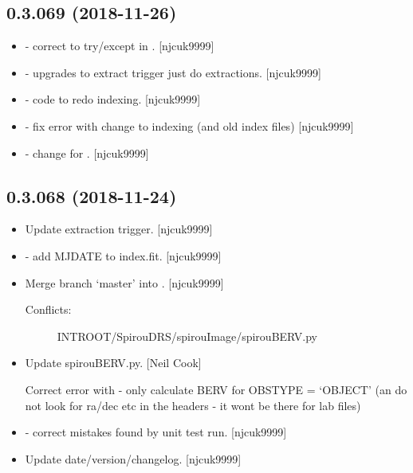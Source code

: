 \documentclass[a4paper,10pt,english]{report}
\begin{document}
\subsection{0.3.069 (2018-11-26)}
\label{\detokenize{misc/changelog:id253}}\begin{itemize}
\item {} 
 - correct to try/except in .
{[}njcuk9999{]}

\item {} 
 - upgrades to extract trigger just do extractions.
{[}njcuk9999{]}

\item {} 
 - code to redo indexing. {[}njcuk9999{]}

\item {} 
 - fix error with change to indexing (and old index
files) {[}njcuk9999{]}

\item {} 
 - change  for .
{[}njcuk9999{]}

\end{itemize}


\subsection{0.3.068 (2018-11-24)}
\label{\detokenize{misc/changelog:id254}}\begin{itemize}
\item {} 
Update extraction trigger. {[}njcuk9999{]}

\item {} 
 - add MJDATE to index.fit. {[}njcuk9999{]}

\item {} 
Merge branch ‘master’ into . {[}njcuk9999{]}
\begin{description}
\item[{Conflicts:}] \leavevmode
INTROOT/SpirouDRS/spirouImage/spirouBERV.py

\end{description}

\item {} 
Update spirouBERV.py. {[}Neil Cook{]}

Correct error with  - only calculate BERV for OBSTYPE = ‘OBJECT’ (an do not look for ra/dec etc in the headers - it wont be there for lab files)

\item {} 
 - correct mistakes found by unit test run.
{[}njcuk9999{]}

\item {} 
Update date/version/changelog. {[}njcuk9999{]}

\end{itemize}
\end{document}
